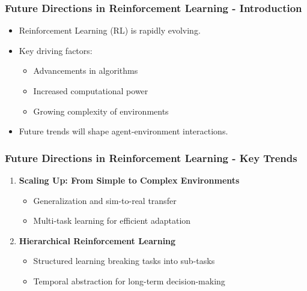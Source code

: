 \documentclass[aspectratio=169]{beamer}
\begin{document}
\begin{frame}[fragile]
    \frametitle{Future Directions in Reinforcement Learning - Introduction}
    \begin{itemize}
        \item Reinforcement Learning (RL) is rapidly evolving.
        \item Key driving factors: 
            \begin{itemize}
                \item Advancements in algorithms
                \item Increased computational power
                \item Growing complexity of environments
            \end{itemize}
        \item Future trends will shape agent-environment interactions.
    \end{itemize}
\end{frame}

\begin{frame}[fragile]
    \frametitle{Future Directions in Reinforcement Learning - Key Trends}
    \begin{enumerate}
        \item \textbf{Scaling Up: From Simple to Complex Environments}
            \begin{itemize}
                \item Generalization and sim-to-real transfer
                \item Multi-task learning for efficient adaptation
            \end{itemize}
            
        \item \textbf{Hierarchical Reinforcement Learning}
            \begin{itemize}
                \item Structured learning breaking tasks into sub-tasks
                \item Temporal abstraction for long-term decision-making
            \end{itemize}
    \end{enumerate}
\end{frame}
\end{document}
